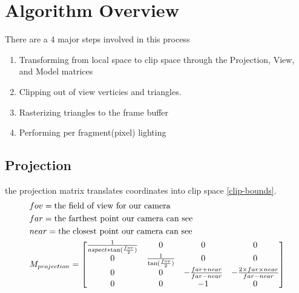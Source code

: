 \documentclass[12pt]{article}
\begin{document}
\section{Algorithm Overview}

There are a 4 major steps involved in this process

\begin{enumerate}
	\item Transforming from local space to clip space through the Projection, View, and Model matrices
	\item Clipping out of view verticies and triangles.
	\item Rasterizing triangles to the frame buffer
	\item Performing per fragment(pixel) lighting 
\end{enumerate}


\subsection{Projection}
the projection matrix translates coordinates into clip space \eqref{clip-bounds}.
\begin{gather*}\begin{align}
		&fov = \text{the field of view for our camera} \notag\\
		&far = \text{the farthest point our camera can see} \notag\\
		&near = \text{the closest point our camera can see} \notag\\
		&M_{projection} = 
		\begin{bmatrix} 
			\frac{1}{aspect*\tan(\frac{fov}2)}&0&0&0\\
			0&\frac{1}{\tan(\frac{fov}2)}&0&0\\
			0&0&-\frac{far+near}{far-near}&-\frac{2\times far \times near}{far-near}\\
			0&0&-1&0
		\end{bmatrix}
\end{align}\end{gather*}
\end{document}

